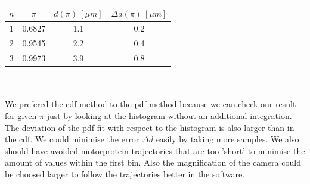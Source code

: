     	\minipanf
    		\centering
    		\begin{tabular}{c|c|c|c}
    	 	       $n$ & $\pi$ & $d(\pi)\ [\unit{\mu m}]$  & $\Delta d(\pi)\ [\unit{\mu m}]$\\
    	 	 \hline		1	& 	0.6827	&	1.1 	& 	0.2\\
    	  				2	&	0.9545	&	2.2		&	0.4\\
    	  				3	&	0.9973	&	3.9		& 	0.8	
    		\end{tabular}
    	\minipend\\
    	\ \\
    	We prefered the cdf-method to the pdf-method because we can check our result for given $\pi$ just by looking at the histogram without an additional integration. The deviation of the pdf-fit with respect to the histogram is also larger than in the cdf. We could minimise the error $\Delta d$ easily by taking more samples. We also should have avoided motorprotein-trajectories that are too 'short' to minimise the amount of values within the first bin. Also the magnification of the camera could be choosed larger to follow the trajectories better in the software.
